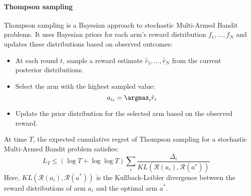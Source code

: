 \paragraph*{Thompson sampling}
Thompson sampling is a Bayesian approach to stochastic Multi-Armed Bandit problems. 
It uses Bayesian priors for each arm's reward distribution $f_1, \dots, f_N$ and updates these distributions based on observed outcomes:
\begin{itemize}
    \item At each round $t$, sample a reward estimate $\hat{r}_1, \dots, \hat{r}_N$ from the current posterior distributions.
    \item Select the arm with the highest sampled value:
        \[a_{i_t} = \argmax_i \hat{r}_i\]
    \item Update the prior distribution for the selected arm based on the observed reward.
\end{itemize}

\begin{theorem}
    At time $T$, the expected cumulative regret of Thompson sampling for a stochastic Multi-Armed Bandit problem satisfies:
    \[L_T \leq \left( \log T + \log\log T \right) \sum_{i} \frac{\Delta_i}{KL(\mathcal{R}(a_i), \mathcal{R}(a^\ast))}\]
    Here, $KL(\mathcal{R}(a_i), \mathcal{R}(a^\ast))$ is the Kullback-Leibler divergence between the reward distributions of arm $a_i$ and the optimal arm $a^\ast$.
\end{theorem}